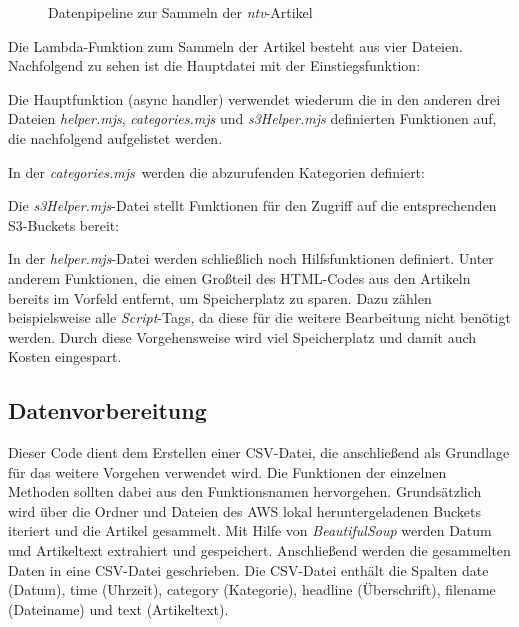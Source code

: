 \documentclass[12pt]{article}
\begin{document}
\begin{sloppypar}
	\begin{figure}[h]
		\centering
		
		\caption{Datenpipeline zur Sammeln der \emph{ntv}-Artikel}
		\label{fig:datenpipeline}
	\end{figure}

	Die Lambda-Funktion zum Sammeln der Artikel besteht aus vier Dateien.
	Nachfolgend zu sehen ist die Hauptdatei mit der Einstiegsfunktion:

	

	Die Hauptfunktion (async handler) verwendet wiederum die in den anderen
	drei Dateien \emph{helper.mjs}, \emph{categories.mjs} und
	\emph{s3Helper.mjs} definierten Funktionen auf, die nachfolgend aufgelistet
	werden.

	In der \emph{categories.mjs} werden die abzurufenden Kategorien definiert:

	

	Die \emph{s3Helper.mjs}-Datei stellt Funktionen für den Zugriff auf die
	entsprechenden S3-Buckets bereit:

	

	In der \emph{helper.mjs}-Datei werden schließlich noch Hilfsfunktionen
	definiert. Unter anderem Funktionen, die einen Großteil des HTML-Codes aus
	den Artikeln bereits im Vorfeld entfernt, um Speicherplatz zu sparen. Dazu
	zählen beispielsweise alle \emph{Script}-Tags, da diese für die weitere
	Bearbeitung nicht benötigt werden. Durch diese Vorgehensweise wird viel
	Speicherplatz und damit auch Kosten eingespart.

	

	\subsection{Datenvorbereitung}

	Dieser Code dient dem Erstellen einer CSV-Datei, die anschließend als
	Grundlage für das weitere Vorgehen verwendet wird. Die Funktionen der
	einzelnen Methoden sollten dabei aus den Funktionsnamen hervorgehen.
	Grundsätzlich wird über die Ordner und Dateien des AWS lokal
	heruntergeladenen Buckets iteriert und die Artikel gesammelt. Mit Hilfe von
	\emph{BeautifulSoup} werden Datum und Artikeltext extrahiert und
	gespeichert. Anschließend werden die gesammelten Daten in eine CSV-Datei
	geschrieben. Die CSV-Datei enthält die Spalten date (Datum), time (Uhrzeit),
	category (Kategorie), headline (Überschrift), filename (Dateiname) und text
	(Artikeltext).


\end{sloppypar}
\end{document}

